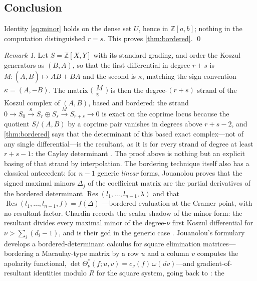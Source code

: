 \documentclass[11pt,reqno]{amsart}
\theoremstyle{definition}
\theoremstyle{remark}
\newtheorem{remark}[remark]{Remark}
\newcommand{\Z}{\mathbb Z}
\newcommand{\Res}{\operatorname{Res}}
\begin{document}
\subsection{Conclusion}
Identity \eqref{eq:minor} holds on the dense set $U$, hence in
$\Z[a,b]$; nothing in the computation distinguished $r=s$.  This
proves \cref{thm:bordered}.  \qed

\begin{remark}\label{rem:koszul}
Let $S=\Z[X,Y]$ with its standard grading, and order the Koszul
generators as $(B,A)$, so that the first differential in degree
$r+s$ is $M:(\dot A,\dot B)\mapsto\dot AB+\dot BA$ and the second
is $\kappa$, matching the sign convention
$\kappa=(A,-B)$.  The matrix
$\bigl(\begin{smallmatrix}M\\v\end{smallmatrix}\bigr)$ is then the
degree-$(r+s)$ strand of the Koszul complex of $(A,B)$, based and
bordered: the strand
$0\to S_0\xrightarrow{\ \kappa\ }S_r\oplus S_s
\xrightarrow{\ M\ }S_{r+s}\to0$
is exact on the coprime locus because the quotient
$S/(A,B)$ by a coprime pair vanishes in degrees
above $r+s-2$, and \cref{thm:bordered} says that the determinant of
this based exact complex---not of any single differential---is the
resultant, as it is for every strand of degree at least
$r+s-1$: the Cayley determinant
\cite{Cayley1848,Jouanolou1991,Chardin1992,Demazure2012}.  The proof
above is nothing but an explicit basing of that strand by
interpolation.  The bordering technique itself also has a classical
antecedent: for $n-1$ generic \emph{linear} forms, Jouanolou proves
that the signed maximal minors $\Delta_j$ of the coefficient matrix
are the partial derivatives of the bordered determinant
$\Res(l_1,\dots,l_{n-1},\lambda)$ and that
$\Res(l_1,\dots,l_{n-1},f)=f(\Delta)$
\cite[5.4.1--5.4.4]{Jouanolou1991}---bordered evaluation at the
Cramer point, with no resultant factor.  Chardin records the scalar
shadow of the minor form: the resultant divides every maximal minor
of the degree-$\nu$ first Koszul differential for
$\nu>\sum_i(d_i-1)$, and is their gcd in the generic case
\cite[\S IV, Remark~1]{Chardin1992}.  Jouanolou's formulary
develops a bordered-determinant calculus for square elimination
matrices---bordering a Macaulay-type matrix by a row $u$ and a
column $v$ computes the apolarity functional,
$\det\Theta^*_\nu(f;u,v)=c_\nu(f)\,\omega(\overline{uv})$---and
gradient-of-resultant identities modulo $R$ for the square system,
going back to \cite[4.6.3, 6.4.2--6.4.3]{Jouanolou1991}: the

\end{remark}
\end{document}
